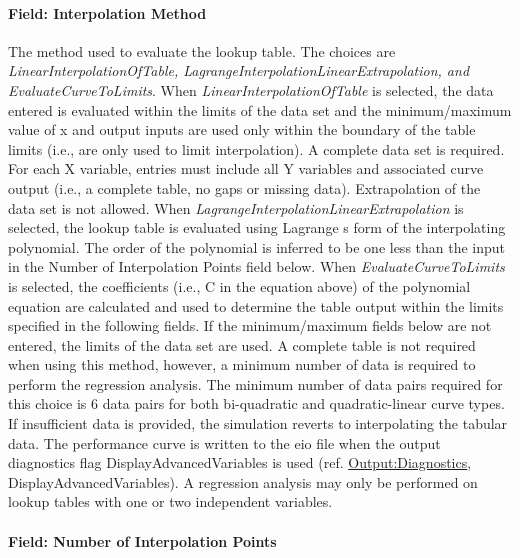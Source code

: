\paragraph{Field: Interpolation Method}\label{field-interpolation-method-2}

The method used to evaluate the lookup table. The choices are \emph{LinearInterpolationOfTable, LagrangeInterpolationLinearExtrapolation, and EvaluateCurveToLimits}. When \emph{LinearInterpolationOfTable} is selected, the data entered is evaluated within the limits of the data set and the minimum/maximum value of x and output inputs are used only within the boundary of the table limits (i.e., are only used to limit interpolation). A complete data set is required. For each X variable, entries must include all Y variables and associated curve output (i.e., a complete table, no gaps or missing data). Extrapolation of the data set is not allowed. When \emph{LagrangeInterpolationLinearExtrapolation} is selected, the lookup table is evaluated using Lagrange s form of the interpolating polynomial. The order of the polynomial is inferred to be one less than the input in the Number of Interpolation Points field below. When \emph{EvaluateCurveToLimits} is selected, the coefficients (i.e., C in the equation above) of the polynomial equation are calculated and used to determine the table output within the limits specified in the following fields. If the minimum/maximum fields below are not entered, the limits of the data set are used. A complete table is not required when using this method, however, a minimum number of data is required to perform the regression analysis. The minimum number of data pairs required for this choice is 6 data pairs for both bi-quadratic and quadratic-linear curve types. If insufficient data is provided, the simulation reverts to interpolating the tabular data. The performance curve is written to the eio file when the output diagnostics flag DisplayAdvancedVariables is used (ref. \hyperref[outputdiagnostics]{Output:Diagnostics}, DisplayAdvancedVariables). A regression analysis may only be performed on lookup tables with one or two independent variables.

\paragraph{Field: Number of Interpolation Points}\label{field-number-of-interpolation-points}


